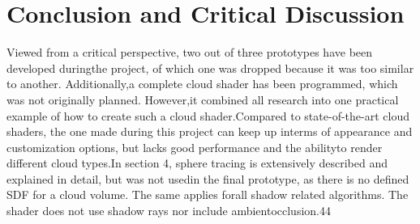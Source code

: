 \section{Conclusion and Critical Discussion}
\label{section:conclusion}
\color{orange} 
Viewed from a critical perspective, two out of three prototypes have been developed duringthe project, of which one was dropped because it was too similar to another.  Additionally,a complete cloud shader has been programmed, which was not originally planned.  However,it combined all research into one practical example of how to create such a cloud shader.Compared to state-of-the-art cloud shaders, the one made during this project can keep up interms of appearance and customization options, but lacks good performance and the abilityto render different cloud types.In section 4, sphere tracing is extensively described and explained in detail, but was not usedin the final prototype, as there is no defined SDF for a cloud volume.  The same applies forall shadow related algorithms.  The shader does not use shadow rays nor include ambientocclusion.44
\color{black}